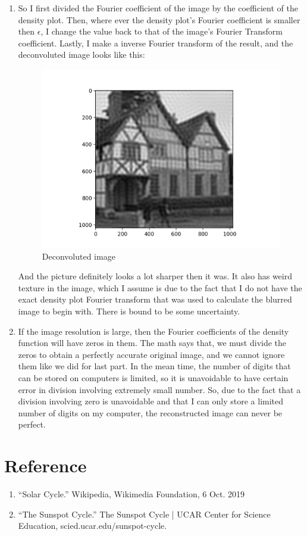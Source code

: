 \documentclass[12pt,letterpaper]{article}
\begin{document}
\begin{enumerate}
    \item 
    So I first divided the Fourier coefficient of the image by the coefficient of the density plot. Then, where ever the density plot's Fourier coefficient is smaller then $\epsilon$, I change the value back to that of the image's Fourier Transform coefficient. Lastly, I make a inverse Fourier transform of the result, and the deconvoluted image looks like this:
    \clearpage
    \begin{figure}[h]
    \centering
    \includegraphics[width=1.\linewidth]{q2c.png}
    \caption{Deconvoluted image}
    \end{figure}
    And the picture definitely looks a lot sharper then it was. It also has weird texture in the image, which I assume is due to the fact that I do not have the exact density plot Fourier transform that was used to calculate the blurred image to begin with. There is bound to be some uncertainty.
    
    \item
    If the image resolution is large, then the Fourier coefficients of the density function will have zeros in them. The math says that, we must divide the zeros to obtain a perfectly accurate original image, and we cannot ignore them like we did for last part. In the mean time, the number of digits that can be stored on computers is limited, so it is unavoidable to have certain error in division involving extremely small number. So, due to the fact that a division involving zero is unavoidable and that I can only store a limited number of digits on my computer, the reconstructed image can never be perfect.
\end{enumerate}
\clearpage
\section*{Reference}
\begin{enumerate}
    \item
    “Solar Cycle.” Wikipedia, Wikimedia Foundation, 6 Oct. 2019
    
    \item
    “The Sunspot Cycle.” The Sunspot Cycle | UCAR Center for Science Education, scied.ucar.edu/sunspot-cycle.
\end{enumerate}
\end{document}
